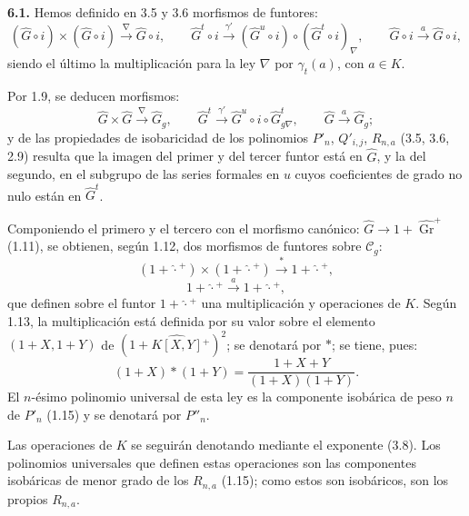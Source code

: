 \textbf{6.1.} Hemos definido en 3.5 y 3.6 morfismos de funtores:
\[
  (\widehat G\circ i)\times(\widehat G\circ i)\xrightarrow{\nabla}\widehat G\circ i,
  \qquad
  \widehat G^t\circ i\xrightarrow{\gamma'}(\widehat G^u\circ i)\circ(\widehat G^t\circ i)_\nabla,
  \qquad
  \widehat G\circ i\xrightarrow{a}\widehat G\circ i,
\]
siendo el último la multiplicación para la ley \(\nabla\) por \(\gamma_t(a)\), con \(a\in K\).

Por 1.9, se deducen morfismos:
\[
  \widehat G\times\widehat G\xrightarrow{\nabla}\widehat G_g,
  \qquad
  \widehat G^t\xrightarrow{\gamma'}\widehat G^u\circ i\circ\widehat G^t_{g\nabla},
  \qquad
  \widehat G\xrightarrow{a}\widehat G_g;
\]
y de las propiedades de isobaricidad de los polinomios \(P'_n\), \(Q'_{i,j}\), \(R_{n,a}\) (3.5, 3.6, 2.9) resulta que la imagen del primer y del tercer funtor está en \(\widehat G\), y la del segundo, en el subgrupo de las series formales en \(u\) cuyos coeficientes de grado no nulo están en \(\widehat G^t\).

Componiendo el primero y el tercero con el morfismo canónico: \(\widehat G\longrightarrow 1+\widehat{\operatorname{Gr}}^{+}\) (1.11), se obtienen, según 1.12, dos morfismos de funtores sobre \(\mathcal C_g\):
\[
  (1+\widehat{\cdot}{}^{+})\times(1+\widehat{\cdot}{}^{+})\xrightarrow{\ \ast\ }1+\widehat{\cdot}{}^{+},
\]
\[
  1+\widehat{\cdot}{}^{+}\xrightarrow{\ a\ }1+\widehat{\cdot}{}^{+},
\]
que definen sobre el funtor \(1+\widehat{\cdot}{}^{+}\) una multiplicación y operaciones de \(K\). Según 1.13, la multiplicación está definida por su valor sobre el elemento \((1+X,1+Y)\) de \((1+\widehat{K[X,Y]}{}^{+})^{2}\); se denotará por \(\ast\); se tiene, pues:
\begin{equation}\tag{6.1.1}
  (1+X)\ast(1+Y)=\frac{1+X+Y}{(1+X)(1+Y)}.
\end{equation}
El \(n\)-ésimo polinomio universal de esta ley es la componente isobárica de peso \(n\) de \(P'_n\) (1.15) y se denotará por \(P''_n\).

Las operaciones de \(K\) se seguirán denotando mediante el exponente (3.8). Los polinomios universales que definen estas operaciones son las componentes isobáricas de menor grado de los \(R_{n,a}\) (1.15); como estos son isobáricos, son los propios \(R_{n,a}\).

